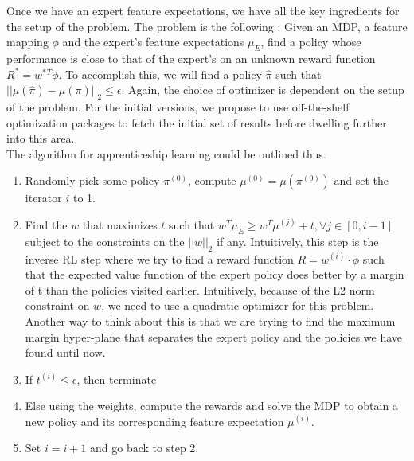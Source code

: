 \documentclass[twoside,11pt]{article}
\begin{document}
Once we have an expert feature expectations, we have all the key ingredients for the setup of the problem. The problem is the following : Given an MDP, a feature mapping $\phi$ and the expert's feature expectations $\mu_E$, find a policy whose performance is close to that of the expert's on an unknown reward function $R^* = w^*{^T}\phi$. To accomplish this, we will find a policy $\hat{\pi}$ such that $||\mu(\hat{\pi}) - \mu(\pi)||_2 \leq \epsilon $. Again, the choice of optimizer is dependent on the setup of the problem. For the initial versions, we propose to use off-the-shelf optimization packages to fetch the initial set of results before dwelling further into this area. \\[6pt]
The algorithm for apprenticeship learning could be outlined thus.
\begin{enumerate}
\item Randomly pick some policy $\pi^{(0)}$, compute $\mu^{(0)}= \mu(\pi ^{(0)} )$ and set the iterator $i$ to 1.
\item Find the $w$ that maximizes $t$ such that $w^T \mu_E \geq w^T \mu^{(j)} + t, \forall j \in [0, i-1]$ subject to the constraints on the $||w||_2$ if any. Intuitively, this step is the inverse RL step where we try to find a reward function $R = w ^{(i)} \cdot \phi $ such that the expected value function of the expert policy does better by a margin of t than the policies visited earlier. Intuitively, because of the L2 norm constraint on $w$, we need to use a quadratic optimizer for this problem.  Another way to think about this is that we are trying to find the maximum margin hyper-plane that separates the expert policy and the policies we have found until now.
\item If $t^{(i)} \leq \epsilon$, then terminate
\item Else using the weights, compute the rewards and solve the MDP to obtain a new policy and its corresponding feature expectation $\mu^{(i)}$.
\item Set $i=i+1$ and go back to step 2.
\end{enumerate}
\end{document}
